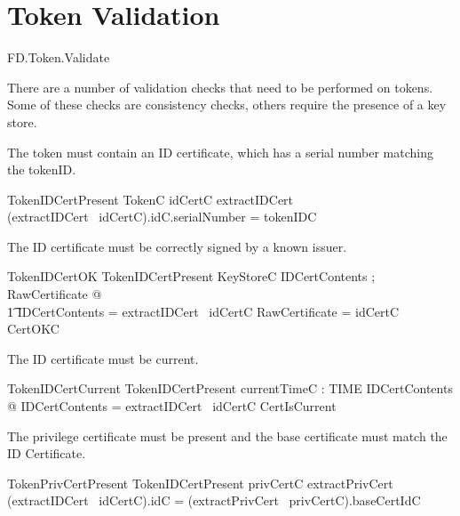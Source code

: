 \section{Token Validation}

\begin{traceunit}{FD.Token.Validate}
\end{traceunit}

There are a number of validation checks that need to be performed on
tokens.
Some of these checks are consistency checks, others require the
presence of a key store.


The token must contain an ID certificate, which has a serial number
matching the tokenID. 

\begin{schema}{TokenIDCertPresent}
        TokenC
\where
       idCertC \in \dom extractIDCert
\\     (extractIDCert~ idCertC).idC.serialNumber = tokenIDC   
\end{schema}

The ID certificate must be correctly signed by a known issuer.

\begin{schema}{TokenIDCertOK}
        TokenIDCertPresent
\also
        KeyStoreC
\where
       \exists IDCertContents ; RawCertificate @ 
\\ \t1          \theta IDCertContents = extractIDCert~ idCertC 
                \land \theta RawCertificate = idCertC 
          \land CertOKC  
\end{schema}

The ID certificate must be current.

\begin{schema}{TokenIDCertCurrent}
        TokenIDCertPresent
\also
        currentTimeC : TIME
\where
        \exists IDCertContents @ \theta IDCertContents =
        extractIDCert~ idCertC 
  \land CertIsCurrent
\end{schema}

The privilege certificate must be present and the base certificate
must match the ID Certificate.

\begin{schema}{TokenPrivCertPresent}
        TokenIDCertPresent
\where
         privCertC \in \dom extractPrivCert
\\      (extractIDCert~ idCertC).idC = (extractPrivCert~ privCertC).baseCertIdC   
\end{schema}

